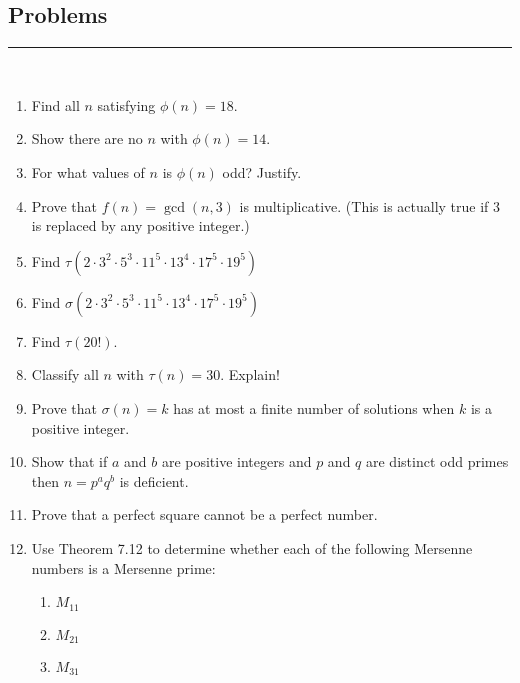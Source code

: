 \documentclass[class=article, crop=false]{standalone}
\begin{document}
\subsection{Problems}
\rule{\textwidth}{1pt}\\
\begin{enumerate}
\item
  Find all $n$ satisfying $\phi(n)=18$.

\item
  Show there are no $n$ with $\phi(n)=14$.

\item
  For what values of $n$ is $\phi(n)$ odd?
  Justify.

\item
  Prove that $f(n)=\gcd(n,3)$ is multiplicative.
  (This is actually true if 3 is replaced by any positive integer.)

\item
  Find $\tau(2\cdot 3^2\cdot 5^3\cdot 11^5\cdot 13^4\cdot 17^5\cdot 19^5)$
\item
  Find $\sigma(2\cdot 3^2\cdot 5^3\cdot 11^5\cdot 13^4\cdot 17^5\cdot 19^5)$

\item
  Find $\tau(20!)$.

\item
  Classify all $n$ with $\tau(n)=30$. Explain!

\item
  Prove that $\sigma(n)=k$
  has at most a finite number of solutions when $k$ is a positive integer.

\item
  Show that if $a$ and $b$ are positive integers
  and $p$ and $q$ are distinct odd primes
  then $n=p^aq^b$ is deficient.

\item
  Prove that a perfect square cannot be a perfect number.

\item
  Use Theorem 7.12 to determine whether each of the following Mersenne numbers
  is a Mersenne prime:
  \begin{enumerate}
  \item
	$M_{11}$
  \item
	$M_{21}$
  \item
	$M_{31}$
  \end{enumerate}

\end{enumerate}
\end{document}
